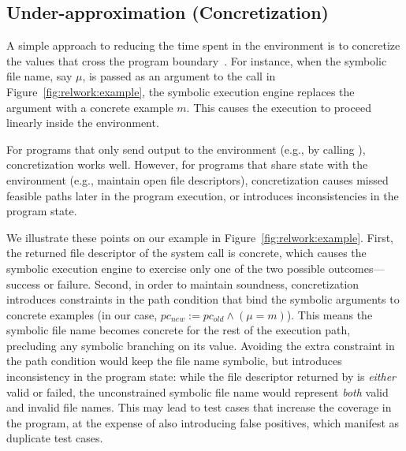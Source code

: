 \subsection{Under-approximation (Concretization)}

A simple approach to reducing the time spent in the environment is to concretize the values that cross the program boundary~\cite{dart,godefroid:fuzz,klee,exe}.
%
For instance, when the symbolic file name, say $\mu$, is passed as an argument to the  call in Figure~\ref{fig:relwork:example}, the symbolic execution engine replaces the argument with a concrete example $m$.  This causes the execution to proceed linearly inside the environment.


For programs that only send output to the environment (e.g., by calling ), concretization works well.
%
However, for programs that share state with the environment (e.g., maintain open file descriptors), concretization causes missed feasible paths later in the program execution, or introduces inconsistencies in the program state.

We illustrate these points on our example in Figure~\ref{fig:relwork:example}.
%
First, the returned file descriptor of the  system call is concrete, which causes the symbolic execution engine to exercise only one of the two possible outcomes---success or failure.
%
Second, in order to maintain soundness, concretization introduces constraints in the path condition that bind the symbolic arguments to concrete examples (in our case, $pc_{new} := pc_{old} \wedge (\mu = m)$).
%
This means the symbolic file name becomes concrete for the rest of the execution path, precluding any symbolic branching on its value.
%
Avoiding the extra constraint in the path condition would keep the file name symbolic, but introduces inconsistency in the program state: while the file descriptor returned by  is \emph{either} valid or failed, the unconstrained symbolic file name would represent \emph{both} valid and invalid file names.
%
This may lead to test cases that increase the coverage in the program, at the expense of also introducing false positives, which manifest as duplicate test cases.

